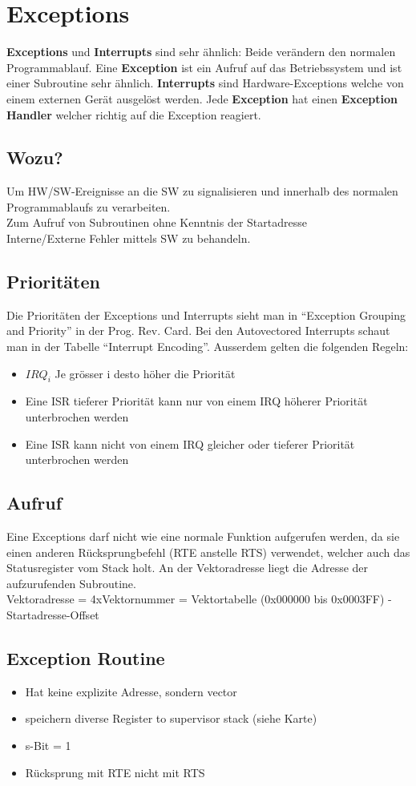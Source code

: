 \section{Exceptions}
\textbf{Exceptions} und \textbf{Interrupts} sind sehr ähnlich: Beide verändern den normalen Programmablauf.
Eine \textbf{Exception} ist ein Aufruf auf das Betriebssystem und ist einer Subroutine sehr ähnlich. 
\textbf{Interrupts} sind Hardware-Exceptions welche von einem externen Gerät ausgelöst werden.
Jede \textbf{Exception} hat einen \textbf{Exception Handler} welcher richtig auf die Exception reagiert.
\subsection{Wozu?}
Um HW/SW-Ereignisse an die SW zu signalisieren und innerhalb des normalen
Programmablaufs zu verarbeiten.\\
Zum Aufruf von Subroutinen ohne Kenntnis der Startadresse\\
Interne/Externe Fehler mittels SW zu behandeln.
\subsection{Prioritäten}
Die Prioritäten der Exceptions und Interrupts sieht man in ``Exception Grouping and Priority'' in
der Prog. Rev. Card. Bei den Autovectored Interrupts schaut man in der Tabelle ``Interrupt
Encoding''. Ausserdem gelten die folgenden Regeln:
\begin{itemize}
	\item $IRQ_i$ Je grösser i desto höher die Priorität
	\item Eine ISR tieferer Priorität kann nur von einem IRQ höherer Priorität unterbrochen werden
	\item Eine ISR kann nicht von einem IRQ gleicher oder tieferer Priorität unterbrochen werden
\end{itemize}
\subsection{Aufruf}
Eine Exceptions darf nicht wie eine normale Funktion aufgerufen werden, da sie einen anderen
Rücksprungbefehl (RTE anstelle RTS) verwendet, welcher auch das Statusregister vom Stack holt.
An der Vektoradresse liegt die Adresse der aufzurufenden Subroutine.\\
Vektoradresse = 4xVektornummer = Vektortabelle (0x000000 bis 0x0003FF) - Startadresse-Offset
\subsection{Exception Routine}
\begin{itemize}
  \item Hat keine explizite Adresse, sondern vector
  \item speichern diverse Register to supervisor stack (siehe Karte)
  \item s-Bit = 1
  \item Rücksprung mit RTE nicht mit RTS
\end{itemize}

